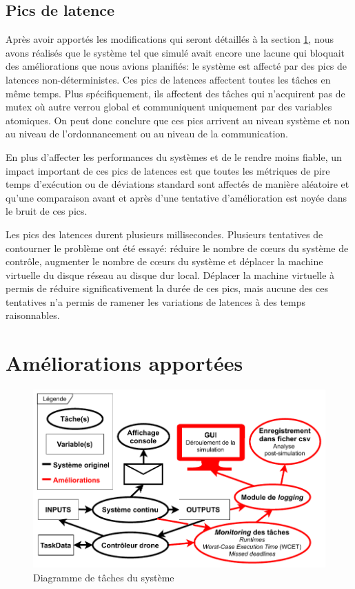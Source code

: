 \documentclass[journal]{IEEEtran}
\begin{document}
\subsection{Pics de latence}

Après avoir apportés les modifications qui seront détaillés à la section \ref{ameliorations}, nous avons réalisés que le système tel que simulé avait encore une lacune qui bloquait des améliorations que nous avions planifiés: le système est affecté par des pics de latences non-déterministes. Ces pics de latences affectent toutes les tâches en même temps. Plus spécifiquement, ils affectent des tâches qui n'acquirent pas de mutex où autre verrou global et communiquent uniquement par des variables atomiques. On peut donc conclure que ces pics arrivent au niveau système et non au niveau de l'ordonnancement ou au niveau de la communication. 

En plus d'affecter les performances du systèmes et de le rendre moins fiable, un impact important de ces pics de latences est que toutes les métriques de pire temps d'exécution ou de déviations standard sont affectés de manière aléatoire et qu'une comparaison avant et après d'une tentative d'amélioration est noyée dans le bruit de ces pics.

Les pics des latences durent plusieurs millisecondes. Plusieurs tentatives de contourner le problème ont été essayé: réduire le nombre de cœurs du système de contrôle, augmenter le nombre de cœurs du système et déplacer la machine virtuelle du disque réseau au disque dur local. Déplacer la machine virtuelle à permis de réduire significativement la durée de ces pics, mais aucune des ces tentatives n'a permis de ramener les variations de latences à des temps raisonnables.

\section{Améliorations apportées}\label{ameliorations}
\begin{figure}
	\centering
	\captionsetup{justification=centering}
	\includegraphics[width=\linewidth]{diagrammeDeTaches_Simple.pdf}
	\caption{Diagramme de tâches du système}
	\label{taskDiagram}
\end{figure}
\end{document}
